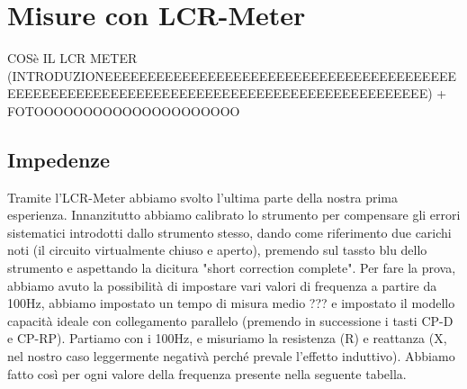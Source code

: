 \section{Misure con LCR-Meter}
\label{sec:lcr}

COSè IL LCR METER (INTRODUZIONEEEEEEEEEEEEEEEEEEEEEEEEEEEEEEEEEEEEEEEEEEEEEEEEEEEEEEEEEEEEEEEEEEEEEEEEEEEEEEEEEEEEEEEEEE) + FOTOOOOOOOOOOOOOOOOOOOOO


\subsection{Impedenze}
\label{sub:z}

Tramite l'LCR-Meter abbiamo svolto l'ultima parte della nostra prima esperienza.
Innanzitutto abbiamo calibrato lo strumento per compensare gli errori sistematici introdotti dallo strumento stesso, dando come riferimento due carichi noti (il circuito virtualmente chiuso e aperto), premendo sul tassto blu dello strumento e aspettando la dicitura "short correction complete".
Per fare la prova, abbiamo avuto la possibilità di impostare vari valori di frequenza a partire da 100Hz, abbiamo impostato un tempo di misura medio ??? e impostato il modello capacità ideale con collegamento parallelo (premendo in successione i tasti CP-D e CP-RP).
Partiamo con i 100Hz, e misuriamo la resistenza (R) e reattanza (X, nel nostro caso leggermente negativà perché prevale l'effetto induttivo). Abbiamo fatto così per ogni valore della frequenza presente nella seguente tabella.  


\begin{table}[ht]
\centering
{}
\caption{LCR, misura Impedenza, Tempo di misura: Long}
\label{tab:lcr_z}
\end{table}

